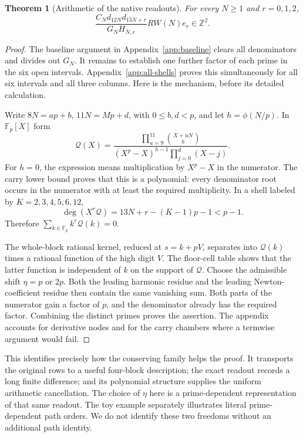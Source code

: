 \documentclass[11pt]{article}
\newtheorem{theorem}{Theorem}
\newcommand{\Z}{\mathbb Z}
\begin{document}
\begin{theorem}[Arithmetic of the native readouts]\label{thm:arithmetic}
For every $N\ge1$ and $r=0,1,2$,
\[
 \boxed{\frac{C_Nd_{12N}d_{13N+r}}{G_NH_{N,r}}RW(N)e_r\in\Z^2.}
\]
\end{theorem}
\begin{proof}
The baseline argument in Appendix~\ref{app:baseline} clears all
denominators and divides out $G_N$. It remains to establish one further
factor of each prime in the six open intervals. Appendix~\ref{app:all-shells}
proves this simultaneously for all six intervals and all three columns.
Here is the mechanism, before its detailed calculation.

Write $8N=ap+b$, $11N=Mp+d$, with $0\le b,d<p$, and let
$h=\phi(N/p)$. In $\mathbb F_p[X]$ form
\[
 \mathcal Q(X)=
 \frac{\displaystyle\prod_{u=9}^{11}\binom{X+uN}{b}}
 {(X^p-X)^{h-1}\displaystyle\prod_{j=0}^d(X-j)}.
\]
For $h=0$, the expression means multiplication by $X^p-X$ in the
numerator. The carry lower bound proves that this is a polynomial:
every denominator root occurs in the numerator with at least the
required multiplicity. In a shell labeled by $K=2,3,4,5,6,12$,
\[
 \deg(X^r\mathcal Q)=13N+r-(K-1)p-1<p-1.
\]
Therefore $\sum_{k\in\mathbb F_p}k^r\mathcal Q(k)=0$.

The whole-block rational kernel, reduced at $s=k+pV$, separates into
$\mathcal Q(k)$ times a rational function of the high digit $V$.
The floor-cell table shows that the latter function is independent
of $k$ on the support of $\mathcal Q$. Choose the admissible shift
$\eta=p$ or $2p$. Both the leading harmonic residue and the leading
Newton-coefficient residue then contain the same vanishing sum.
Both parts of the numerator gain a factor of $p$, and the denominator
already has the required factor. Combining the distinct primes proves
the assertion. The appendix accounts for derivative nodes and for the
carry chambers where a termwise argument would fail.
\end{proof}

This identifies precisely how the conserving family helps the proof.
It transports the original rows to a useful four-block description;
the exact readout records a long finite difference; and its polynomial
structure supplies the uniform arithmetic cancellation. The choice of
$\eta$ here is a prime-dependent representation of that same readout.
The toy example separately illustrates literal prime-dependent path
orders. We do not identify these two freedoms without an additional
path identity.
\end{document}
